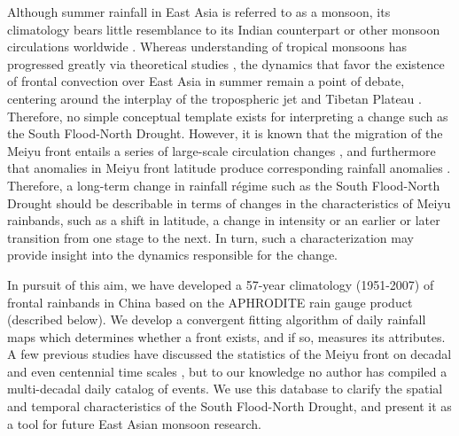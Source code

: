 \documentclass[draft,grl]{AGUTeX}
\begin{document}
\begin{article}
	Although summer rainfall in East Asia is referred to as a monsoon, its climatology bears little resemblance to its Indian counterpart or other monsoon circulations worldwide \citep{Ding2005}. Whereas understanding of tropical monsoons has progressed greatly via theoretical studies \citep{Plumb1992,Prive2007,Bordoni2008}, the dynamics that favor the existence of frontal convection over East Asia in summer remain a point of debate, centering around the interplay of the tropospheric jet and Tibetan Plateau \citep{Molnar2010,Sampe2010,Chen2014}. Therefore, no simple conceptual template exists for interpreting a change such as the South Flood-North Drought. However, it is known that the migration of the Meiyu front entails a series of large-scale circulation changes \citep{Chen2004}, and furthermore that anomalies in Meiyu front latitude produce corresponding rainfall anomalies \citep{Kosaka2011}. Therefore, a long-term change in rainfall r\'egime such as the South Flood-North Drought should be describable in terms of changes in the characteristics of Meiyu rainbands, such as a shift in latitude, a change in intensity or an earlier or later transition from one stage to the next. In turn, such a characterization may provide insight into the dynamics responsible for the change.
	
	In pursuit of this aim, we have developed a 57-year climatology (1951-2007) of frontal rainbands in China based on the APHRODITE rain gauge product (described below). We develop a convergent fitting algorithm of daily rainfall maps which determines whether a front exists, and if so, measures its attributes. A few previous studies have discussed the statistics of the Meiyu front on decadal and even centennial time scales \citep{Chen2004,Ge2008,Xu2009}, but to our knowledge no author has compiled a multi-decadal daily catalog of events. We use this database to clarify the spatial and temporal characteristics of the South Flood-North Drought, and present it as a tool for future East Asian monsoon research.
		

\end{article}
\end{document}
